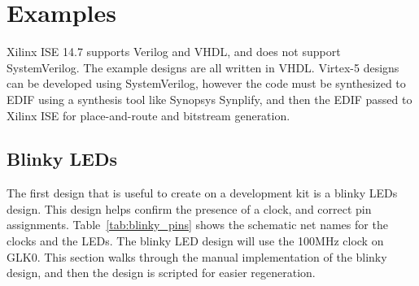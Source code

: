 \section{Examples}
%
Xilinx ISE 14.7 supports Verilog and VHDL, and does not support SystemVerilog.
The example designs are all written in VHDL. Virtex-5 designs can be developed
using SystemVerilog, however the code must be synthesized to EDIF using a 
synthesis tool like Synopsys Synplify, and then the EDIF passed to Xilinx ISE 
for place-and-route and bitstream generation.

\subsection{Blinky LEDs}
%
The first design that is useful to create on a development kit is a blinky
LEDs design. This design helps confirm the presence of a clock, and correct
pin assignments.
%
Table~\ref{tab:blinky_pins} shows the schematic net names for the clocks and
the LEDs. The blinky LED design will use the 100MHz clock on GLK0.
%
This section walks through the manual implementation of the blinky design, 
and then the design is scripted for easier regeneration.

